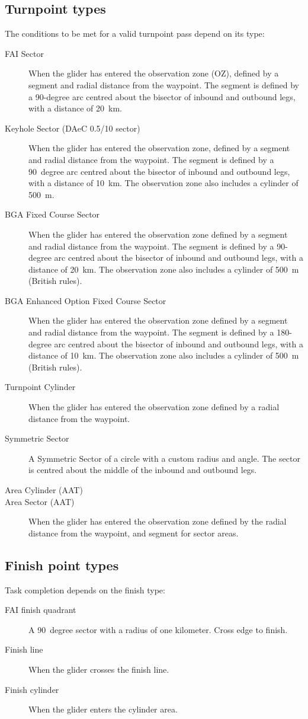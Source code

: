 \subsection*{Turnpoint types}
The conditions to be met for a valid turnpoint pass depend on its
 type:
\begin{description}
\item[FAI Sector] When the glider has entered the observation zone (OZ), defined
by a segment and radial distance from the waypoint.  The segment is
defined by a 90-degree arc centred about the bisector of inbound and
outbound legs, with a distance of 20~km.
\item[Keyhole Sector (DAeC 0.5/10 sector)] When the glider has entered the
observation zone, defined by a segment and radial distance from the waypoint.  The segment is
defined by a 90~degree arc centred about the bisector of inbound and
outbound legs, with a distance of 10~km.  The observation zone also includes
a cylinder of 500~m.
\item[BGA Fixed Course Sector]  When the glider has entered the
observation zone defined by a segment and radial distance from the
waypoint. The segment is defined by a 90-degree arc centred about the
bisector of inbound and outbound legs, with a distance of 20~km.
The observation zone also includes a cylinder of 500~m (British rules).
\item[BGA Enhanced Option Fixed Course Sector]  When the glider has entered the
observation zone defined by a segment and radial distance from the
waypoint. The segment is defined by a 180-degree arc centred about the
bisector of inbound and outbound legs, with a distance of 10~km.
The observation zone also includes a cylinder of 500~m (British rules).
\item[Turnpoint Cylinder]  When the glider has entered the observation zone
defined by a radial distance from the waypoint.
\item[Symmetric Sector] A Symmetric Sector of a circle with a custom
radius and angle. The sector is centred about the middle of the inbound and
outbound legs.
\item[Area Cylinder (AAT)] %
\item[Area Sector (AAT)]  When the glider has entered the observation zone
defined by the radial distance from the waypoint, and segment for sector areas.
\end{description}

\subsection*{Finish point types}
Task completion depends on the finish type:
\begin{description}
\item[FAI finish quadrant] A 90~degree sector with a radius of one kilometer. Cross edge to finish.
\item[Finish line] When the glider crosses the finish line.
\item[Finish cylinder] When the glider enters the cylinder area.
\end{description}

